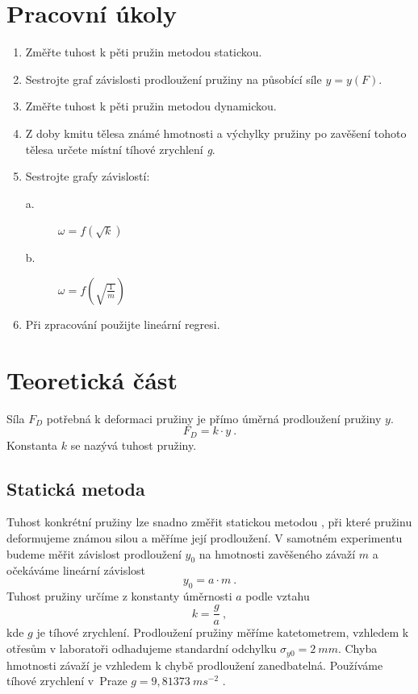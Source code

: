 \documentclass{article}
\begin{document}
\begin{titlepage}


\end{titlepage}



\section*{Pracovní úkoly}
\begin{enumerate}
\item Změřte tuhost k pěti pružin metodou statickou.
\item Sestrojte graf závislosti prodloužení pružiny na působící síle $y=y(F)$.
\item Změřte tuhost k pěti pružin metodou dynamickou.
\item Z doby kmitu tělesa známé hmotnosti a výchylky pružiny po zavěšení tohoto tělesa určete místní tíhové zrychlení \emph{g}.
\item Sestrojte grafy závislostí:
\begin{description}
\item[a.] $\omega = f(\sqrt{k})$
\item[b.] $\omega = f(\sqrt{\frac{1}{m}})$
\end{description}
\item Při zpracování použijte lineární regresi.
\end{enumerate}

\section*{Teoretická část}

Síla $F_{D}$ potřebná k deformaci pružiny je přímo úměrná prodloužení pružiny $y$. 
\begin{equation} \label{eFD}
F_{D}=k \cdot y~.
\end{equation} 
Konstanta $k$ se nazývá tuhost pružiny.
\subsection*{Statická metoda}
Tuhost konkrétní pružiny lze snadno změřit statickou metodou \cite{ZFP}, při které pružinu deformujeme známou silou a měříme její prodloužení. V samotném experimentu budeme měřit závislost prodloužení $y_{0}$ na hmotnosti zavěšeného závaží $m$ a očekáváme lineární závislost
\begin{equation} \label{ey0}
y_{0}=a \cdot m~.
\end{equation}
Tuhost pružiny určíme z konstanty úměrnosti $a$ podle vztahu
\begin{equation} \label{ek}
k=\frac{g}{a}~,
\end{equation}
kde $g$ je tíhové zrychlení. Prodloužení pružiny měříme katetometrem, vzhledem k otřesům v laboratoři odhadujeme standardní odchylku $\sigma _{y0} = 2~mm$. Chyba hmotnosti závaží je vzhledem k chybě prodloužení zanedbatelná. Používáme tíhové zrychlení v~Praze $g=9,81373~ms^{-2}$ \cite{wolfram}.
\end{document}
